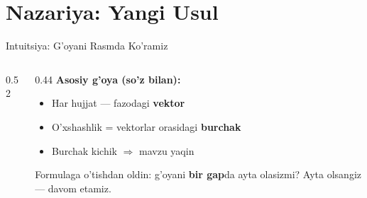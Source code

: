 \documentclass[aspectratio=169,11pt]{beamer}
\begin{document}
\section[Nazariya]{Nazariya: Yangi Usul}

\begin{frame}{Intuitsiya: G'oyani Rasmda Ko'ramiz}
  \begin{columns}
    \begin{column}{0.52\textwidth}
      \begin{center}
      \end{center}
    \end{column}
    \begin{column}{0.44\textwidth}
      \textbf{Asosiy g'oya (so'z bilan):}
      \begin{itemize}\setlength\itemsep{4pt}
        \item Har hujjat --- fazodagi \textbf{vektor}
        \item O'xshashlik = vektorlar orasidagi \textbf{burchak}
        \item Burchak kichik $\Rightarrow$ mavzu yaqin
      \end{itemize}
      \vspace{0.2em}
      \begin{tcolorbox}[okbox]
        \small Formulaga o'tishdan oldin: g'oyani \textbf{bir gap}da
        ayta olasizmi? Ayta olsangiz --- davom etamiz.
      \end{tcolorbox}
    \end{column}
  \end{columns}
\end{frame}
\end{document}
